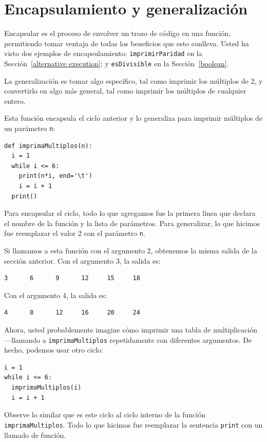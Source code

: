 \section{Encapsulamiento y generalización}

\label{encapsulation}

  

Encapsular es el proceso de envolver un trozo de código en una función,
permitiendo tomar ventaja de todas los beneficios que esto conlleva.
Usted ha visto dos ejemplos de encapsulamiento: \texttt{imprimirParidad}
en la Sección~\ref{alternative execution}; y \texttt{esDivisible}
en la Sección~\ref{boolean}.

La generalización es tomar algo específico, tal como imprimir los
múltiplos de 2, y convertirlo en algo más general, tal como imprimir
los múltiplos de cualquier entero.

Esta función encapsula el ciclo anterior y lo generaliza para imprimir
múltiplos de un parámetro \texttt{n}:
\begin{verbatim}
def imprimaMultiplos(n):
  i = 1
  while i <= 6:
    print(n*i, end='\t')
    i = i + 1
  print()
\end{verbatim}

Para encapsular el ciclo, todo lo que agregamos fue la primera línea
que declara el nombre de la función y la lista de parámetros. Para
generalizar, lo que hicimos fue reemplazar el valor 2 con el parámetro
\texttt{n}.

Si llamamos a esta función con el argumento 2, obtenemos la misma
salida de la sección anterior. Con el argumento 3, la salida es:
\begin{verbatim}
3      6      9      12     15     18
\end{verbatim}
Con el argumento 4, la salida es:
\begin{verbatim}
4      8      12     16     20     24
\end{verbatim}
Ahora, usted probablemente imagine cómo imprimir una tabla de multiplicación
—llamando a \texttt{imprimaMultiplos} repetidamente con diferentes
argumentos. De hecho, podemos usar otro ciclo:

\begin{verbatim}
i = 1
while i <= 6:
  imprimaMultiplos(i)
  i = i + 1
\end{verbatim}

Observe lo similar que es este ciclo al ciclo interno de la función
\texttt{imprimaMultiplos}. Todo lo que hicimos fue reemplazar la sentencia
\texttt{print} con un llamado de función.

